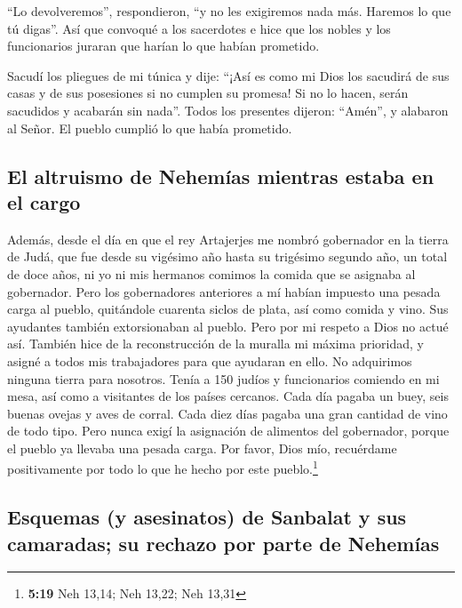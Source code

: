  ``Lo devolveremos'', respondieron, ``y no les exigiremos
nada más. Haremos lo que tú digas''. Así que convoqué a los sacerdotes e
hice que los nobles y los funcionarios juraran que harían lo que habían
prometido.

 Sacudí los pliegues de mi túnica y dije: ``¡Así es como
mi Dios los sacudirá de sus casas y de sus posesiones si no cumplen su
promesa! Si no lo hacen, serán sacudidos y acabarán sin nada''. Todos
los presentes dijeron: ``Amén'', y alabaron al Señor. El pueblo cumplió
lo que había prometido.

\hypertarget{el-altruismo-de-nehemuxedas-mientras-estaba-en-el-cargo}{%
\subsection{El altruismo de Nehemías mientras estaba en el
cargo}\label{el-altruismo-de-nehemuxedas-mientras-estaba-en-el-cargo}}

 Además, desde el día en que el rey Artajerjes me nombró
gobernador en la tierra de Judá, que fue desde su vigésimo año hasta su
trigésimo segundo año, un total de doce años, ni yo ni mis hermanos
comimos la comida que se asignaba al gobernador.  Pero
los gobernadores anteriores a mí habían impuesto una pesada carga al
pueblo, quitándole cuarenta siclos de plata, así como comida y vino. Sus
ayudantes también extorsionaban al pueblo. Pero por mi respeto a Dios no
actué así.  También hice de la reconstrucción de la
muralla mi máxima prioridad, y asigné a todos mis trabajadores para que
ayudaran en ello. No adquirimos ninguna tierra para nosotros.
 Tenía a 150 judíos y funcionarios comiendo en mi mesa,
así como a visitantes de los países cercanos.  Cada día
pagaba un buey, seis buenas ovejas y aves de corral. Cada diez días
pagaba una gran cantidad de vino de todo tipo. Pero nunca exigí la
asignación de alimentos del gobernador, porque el pueblo ya llevaba una
pesada carga.  Por favor, Dios mío, recuérdame
positivamente por todo lo que he hecho por este pueblo.\footnote{\textbf{5:19}
  Neh 13,14; Neh 13,22; Neh 13,31}

\hypertarget{esquemas-y-asesinatos-de-sanbalat-y-sus-camaradas-su-rechazo-por-parte-de-nehemuxedas}{%
\subsection{Esquemas (y asesinatos) de Sanbalat y sus camaradas; su
rechazo por parte de
Nehemías}\label{esquemas-y-asesinatos-de-sanbalat-y-sus-camaradas-su-rechazo-por-parte-de-nehemuxedas}}

